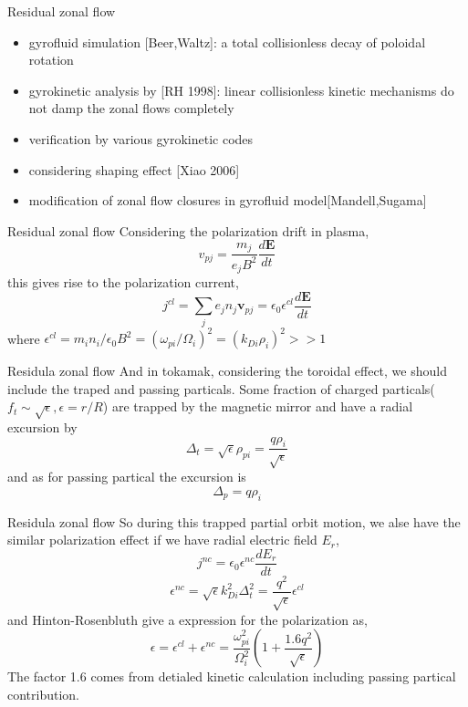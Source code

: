 \documentclass{beamer}
\begin{document}
\begin{frame}{Residual zonal flow}
\begin{itemize}
	\item gyrofluid simulation [Beer,Waltz]: a total collisionless decay of poloidal rotation
	\item gyrokinetic analysis by [RH 1998]: linear collisionless kinetic mechanisms do not damp the zonal flows completely
	\item verification by various gyrokinetic codes
	\item considering shaping effect [Xiao 2006]
	\item modification of zonal flow closures in gyrofluid model[Mandell,Sugama]
\end{itemize}
\end{frame}

\begin{frame}{Residual zonal flow }
Considering the polarization drift in plasma, 
\begin{equation}
v_{pj}=\frac{m_j}{e_jB^2}\frac{d\pmb{E}}{dt}
\end{equation}
this gives rise to the polarization current,
\begin{equation}
j^{cl}=\sum_{j}{e_jn_j\pmb{v}_{pj}}=\epsilon_0\epsilon^{cl}\frac{d\pmb{E}}{dt}
\end{equation}
where $\epsilon^{cl}=m_in_i/\epsilon_0B^2=(\omega_{pi}/\Omega_i)^2=(k_{Di}\rho_i)^2>>1$
\end{frame}

\begin{frame}{Residula zonal flow}
And in tokamak, considering the toroidal effect, we should include the traped and passing particals. Some fraction of charged particals($f_t\sim\sqrt{\epsilon},\epsilon=r/R$) are trapped by the magnetic mirror and have a radial excursion by 
\begin{equation}
\Delta_t=\sqrt{\epsilon}\rho_{pi}=\frac{q\rho_i}{\sqrt{\epsilon}}
\end{equation}
and as for passing partical the excursion is
\begin{equation}
\Delta_p=q\rho_i
\end{equation}
\end{frame}


\begin{frame}{Residula zonal flow}
So during this trapped partial orbit motion, we alse have the similar polarization effect if we have radial electric field $E_r$, 
\begin{equation}
j^{nc}=\epsilon_0\epsilon^{nc}\frac{dE_r}{dt}
\end{equation}
\begin{equation}
\epsilon^{nc}=\sqrt{\epsilon}k_{Di}^2\Delta_t^2=\frac{q^2}{\sqrt{\epsilon}}\epsilon^{cl}
\end{equation}
and Hinton-Rosenbluth give a expression for the polarization as,
\begin{equation}
\epsilon=\epsilon^{cl}+\epsilon^{nc}=\frac{\omega_{pi}^2}{\Omega_i^2}(1+\frac{1.6q^2}{\sqrt{\epsilon}})
\end{equation}
The factor 1.6 comes from detialed kinetic calculation including passing partical contribution.
\end{frame}
\end{document}
